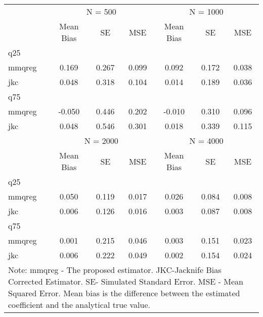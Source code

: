 \begin{tabular}{l*{6}{c}}
\hline
            &     \multicolumn{3}{c}{N = 500}   &     \multicolumn{3}{c}{N = 1000}            \\
            &  Mean Bias &          SE&        MSE&   Mean Bias&          SE&        MSE \\
\hline
q25         &            &            &            &            &            &            \\
mmqreg      &       0.169&       0.267&       0.099&       0.092&       0.172&       0.038\\
jkc         &       0.048&       0.318&       0.104&       0.014&       0.189&       0.036\\
\hline
q75         &            &            &            &            &            &            \\
mmqreg      &      -0.050&       0.446&       0.202&      -0.010&       0.310&       0.096\\
jkc         &       0.048&       0.546&       0.301&       0.018&       0.339&       0.115\\
\hline
            &     \multicolumn{3}{c}{N = 2000}   &     \multicolumn{3}{c}{N = 4000}            \\
            &  Mean Bias &          SE&        MSE&   Mean Bias&          SE&        MSE \\
\hline
q25         &            &            &            &            &            &            \\
mmqreg      &       0.050&       0.119&       0.017&       0.026&       0.084&       0.008\\
jkc         &       0.006&       0.126&       0.016&       0.003&       0.087&       0.008\\
\hline
q75         &            &            &            &            &            &            \\
mmqreg      &       0.001&       0.215&       0.046&       0.003&       0.151&       0.023\\
jkc         &       0.006&       0.222&       0.049&       0.002&       0.154&       0.024\\
\hline
\multicolumn{7}{p{.7\textwidth}}{ \footnotesize Note: mmqreg - The proposed estimator. 
JKC-Jacknife Bias Corrected Estimator. SE- Simulated Standard Error.
MSE - Mean Squared Error. Mean bias is the difference 
between the estimated coefficient and the analytical true value. }\\
\end{tabular}
